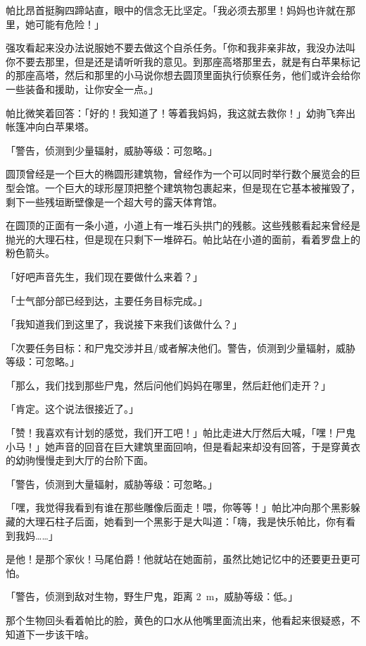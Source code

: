 帕比昂首挺胸四蹄站直，眼中的信念无比坚定。「我必须去那里！妈妈也许就在那里，她可能有危险！」

强攻看起来没办法说服她不要去做这个自杀任务。「你和我非亲非故，我没办法叫你不要去那里，但是还是请听听我的意见。到那座高塔那里去，就是有白苹果标记的那座高塔，然后和那里的小马说你想去圆顶里面执行侦察任务，他们或许会给你一些装备和援助，让你安全一点。」

帕比微笑着回答：「好的！我知道了！等着我妈妈，我这就去救你！」幼驹飞奔出帐篷冲向白苹果塔。

\horizonline


「{\mt 警告，侦测到少量辐射，威胁等级：可忽略。}」

圆顶曾经是一个巨大的椭圆形建筑物，曾经作为一个可以同时举行数个展览会的巨型会馆。一个巨大的球形屋顶把整个建筑物包裹起来，但是现在它基本被摧毁了，剩下一些残垣断壁像是一个超大号的露天体育馆。

在圆顶的正面有一条小道，小道上有一堆石头拱门的残骸。这些残骸看起来曾经是抛光的大理石柱，但是现在只剩下一堆碎石。帕比站在小道的面前，看着罗盘上的粉色箭头。

「好吧声音先生，我们现在要做什么来着？」

「{\mt 士气部分部已经到达，主要任务目标完成。}」

「我知道我们到这里了，我说接下来我们该做什么？」

「{\mt 次要任务目标：和尸鬼交涉并且/或者解决他们。警告，侦测到少量辐射，威胁等级：可忽略。}」

「那么，我们找到那些尸鬼，然后问他们妈妈在哪里，然后赶他们走开？」

「{\mt 肯定。这个说法很接近了。}」

「赞！我喜欢有计划的感觉，我们开工吧！」帕比走进大厅然后大喊，「嘿！尸鬼小马！」她声音的回音在巨大建筑里面回响，但是看起来却没有回答，于是穿黄衣的幼驹慢慢走到大厅的台阶下面。

「{\mt 警告，侦测到大量辐射，威胁等级：可忽略。}」

「嘿，我觉得我看到有谁在那些雕像后面走！喂，你等等！」帕比冲向那个黑影躲藏的大理石柱子后面，她看到一个黑影于是大叫道：「嗨，我是快乐帕比，你有看到我妈……」

是他！是那个家伙！马尾伯爵！他就站在她面前，虽然比她记忆中的还要更丑更可怕。

「{\mt 警告，侦测到敌对生物，野生尸鬼，距离 \SI{2}{m}，威胁等级：低。}」

那个生物回头看着帕比的脸，黄色的口水从他嘴里面流出来，他看起来很疑惑，不知道下一步该干啥。

